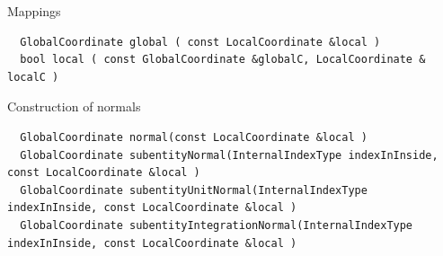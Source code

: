 \noindent
Mappings \\
\begin{mybox}
\begin{lstlisting}
  GlobalCoordinate global ( const LocalCoordinate &local )
  bool local ( const GlobalCoordinate &globalC, LocalCoordinate & localC )
\end{lstlisting}
\end{mybox}

\noindent
Construction of normals \\
\begin{mybox}
\begin{lstlisting}
  GlobalCoordinate normal(const LocalCoordinate &local )
  GlobalCoordinate subentityNormal(InternalIndexType indexInInside, const LocalCoordinate &local )
  GlobalCoordinate subentityUnitNormal(InternalIndexType indexInInside, const LocalCoordinate &local )
  GlobalCoordinate subentityIntegrationNormal(InternalIndexType indexInInside, const LocalCoordinate &local )
\end{lstlisting}
\end{mybox}







